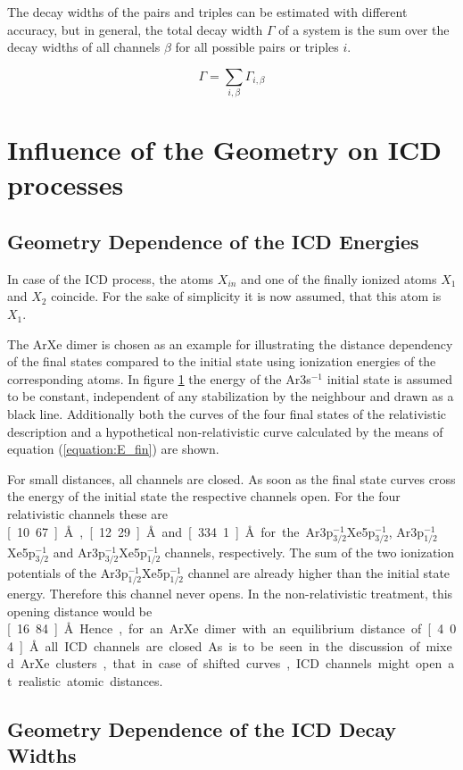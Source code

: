 The decay widths of the pairs and triples can be estimated with
different accuracy, but in general, the total decay width $\Gamma$ of
a system is the sum over the decay widths of all channels $\beta$ for
all possible pairs or triples $i$.

\begin{equation}
  \Gamma = \sum\limits_{i,\beta}\Gamma_{i,\beta}
\end{equation}


\section{Influence of the Geometry on ICD processes}

\subsection{Geometry Dependence of the ICD Energies}
In case of the \ac{ICD} process, the atoms $X_{in}$ and one of
the finally ionized atoms $X_1$ and $X_2$ coincide. For the sake of simplicity
it is now assumed, that this atom is $X_1$.

\begin{figure}[h]
 \centering
 
 \caption{}
 \label{figure:ArXe_energy_curves_unshifted}
\end{figure}

The ArXe dimer is chosen as an example for illustrating the distance
dependency of the final states compared to the initial state using
ionization energies of the corresponding atoms.
In figure \ref{figure:ArXe_energy_curves_unshifted} the energy of
the Ar3s$^{-1}$ initial
state is assumed to be constant, independent of any stabilization by the
neighbour and drawn as a black line. Additionally both the
curves of the four final states of the relativistic description and
a hypothetical non-relativistic curve calculated by the means of
equation (\ref{equation:E_fin}) are shown.

For small distances, all channels are closed. As soon as the final
state curves cross the energy of the initial state
the respective channels open. For the four relativistic channels these are
\unit[10.67]{\AA}, \unit[12.29]{\AA} and \unit[334.1]{\AA}
for the Ar3p$_{3/2}^{-1}$Xe5p$_{3/2}^{-1}$,
Ar3p$_{1/2}^{-1}$Xe5p$_{3/2}^{-1}$ and Ar3p$_{3/2}^{-1}$Xe5p$_{1/2}^{-1}$
channels, respectively.
The sum of the two ionization potentials of the
Ar3p$_{1/2}^{-1}$Xe5p$_{1/2}^{-1}$ channel are already higher than
the initial state energy. Therefore this channel never opens.
In the non-relativistic treatment, this opening distance would be
\unit[16.84]{\AA}.

Hence, for an ArXe dimer with an equilibrium distance of \unit[4.04]{\AA}
all ICD channels are closed. As is to be seen in the discussion of mixed
ArXe clusters, that in case of shifted curves, ICD channels might
open at realistic atomic distances.


\subsection{Geometry Dependence of the ICD Decay Widths}

